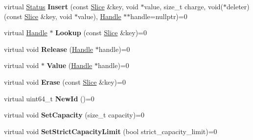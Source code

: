 \begin{DoxyCompactItemize}
\item 
virtual \hyperlink{classrocksdb_1_1Status}{Status} {\bfseries Insert} (const \hyperlink{classrocksdb_1_1Slice}{Slice} \&key, void $\ast$value, size\+\_\+t charge, void($\ast$deleter)(const \hyperlink{classrocksdb_1_1Slice}{Slice} \&key, void $\ast$value), \hyperlink{structrocksdb_1_1Cache_1_1Handle}{Handle} $\ast$$\ast$handle=nullptr)=0\hypertarget{classrocksdb_1_1Cache_aeeb1f83d19acd5e1dd08509361d17fd1}{}\label{classrocksdb_1_1Cache_aeeb1f83d19acd5e1dd08509361d17fd1}

\item 
virtual \hyperlink{structrocksdb_1_1Cache_1_1Handle}{Handle} $\ast$ {\bfseries Lookup} (const \hyperlink{classrocksdb_1_1Slice}{Slice} \&key)=0\hypertarget{classrocksdb_1_1Cache_a3df9823558cb3e87be72a61d494601d8}{}\label{classrocksdb_1_1Cache_a3df9823558cb3e87be72a61d494601d8}

\item 
virtual void {\bfseries Release} (\hyperlink{structrocksdb_1_1Cache_1_1Handle}{Handle} $\ast$handle)=0\hypertarget{classrocksdb_1_1Cache_a0c407981dfc226d8ec65e6b076aab42d}{}\label{classrocksdb_1_1Cache_a0c407981dfc226d8ec65e6b076aab42d}

\item 
virtual void $\ast$ {\bfseries Value} (\hyperlink{structrocksdb_1_1Cache_1_1Handle}{Handle} $\ast$handle)=0\hypertarget{classrocksdb_1_1Cache_a18ed26fd1e9e7097fea1a8ee3b2599b4}{}\label{classrocksdb_1_1Cache_a18ed26fd1e9e7097fea1a8ee3b2599b4}

\item 
virtual void {\bfseries Erase} (const \hyperlink{classrocksdb_1_1Slice}{Slice} \&key)=0\hypertarget{classrocksdb_1_1Cache_a17a30d33adccef40afe04ce729f7a2f2}{}\label{classrocksdb_1_1Cache_a17a30d33adccef40afe04ce729f7a2f2}

\item 
virtual uint64\+\_\+t {\bfseries New\+Id} ()=0\hypertarget{classrocksdb_1_1Cache_a0f53cd36aae877c68a28d128734a2b4a}{}\label{classrocksdb_1_1Cache_a0f53cd36aae877c68a28d128734a2b4a}

\item 
virtual void {\bfseries Set\+Capacity} (size\+\_\+t capacity)=0\hypertarget{classrocksdb_1_1Cache_a752de19d361112a191f61f5fcb47758d}{}\label{classrocksdb_1_1Cache_a752de19d361112a191f61f5fcb47758d}

\item 
virtual void {\bfseries Set\+Strict\+Capacity\+Limit} (bool strict\+\_\+capacity\+\_\+limit)=0\hypertarget{classrocksdb_1_1Cache_a241b2e3c50e9cdfa53733cb5f7d8e899}{}\label{classrocksdb_1_1Cache_a241b2e3c50e9cdfa53733cb5f7d8e899}


\end{DoxyCompactItemize}
